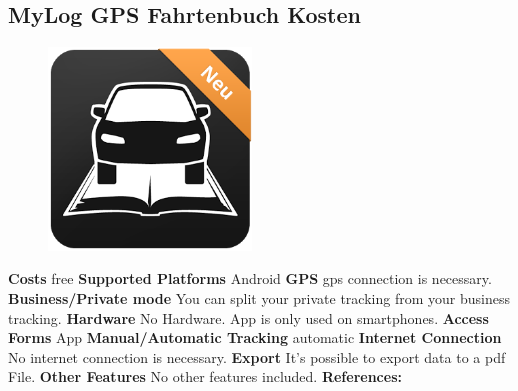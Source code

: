 \begin{singlespace}
\section{MyLog GPS Fahrtenbuch Kosten}
\begin{figure}
  \begin{center}
    \includegraphics[width=0.48\textwidth]{bilder/mylog}
  \end{center}
\end{figure}
\textbf{Costs} free
\newline\newline
\textbf{Supported Platforms} Android
\newline\newline
\textbf{GPS} \gls{gps} connection is necessary.
\newline\newline
\textbf{Business/Private mode} You can split your private tracking from your business tracking.
\newline\newline
\textbf{Hardware} No Hardware. App is only used on smartphones.
\newline\newline
\textbf{Access Forms} App
\newline\newline
\textbf{Manual/Automatic Tracking} automatic
\newline\newline
\textbf{Internet Connection} No internet connection is necessary.
\newline\newline
\textbf{Export} It’s possible to export data to a \gls{pdf} File.
\newline\newline
\textbf{Other Features} No other features included.
\newline\newline
\textbf{References:} \cite{MyLog_GPS_Fahrtenbuch_Costs}
\newpage
\clearpageauthor

\end{singlespace}
